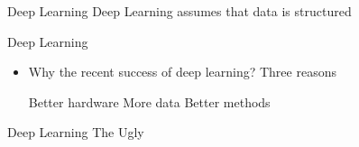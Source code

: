 \begin{slide}{Deep Learning}
  {\Large
    Deep Learning assumes that data is structured\\

  }
\end{slide}




\begin{slide}{Deep Learning}
  \begin{itemize}
    \item Why the recent success of deep learning? %
    \pitem Three reasons
    \begin{enumerate}
      \pitem Better hardware
      \pitem More data
      \pitem Better methods
    \end{enumerate}
  \end{itemize}
\end{slide}

\begin{slide}{Deep Learning}
  {
    \Huge
    The Ugly
  }
\end{slide}
